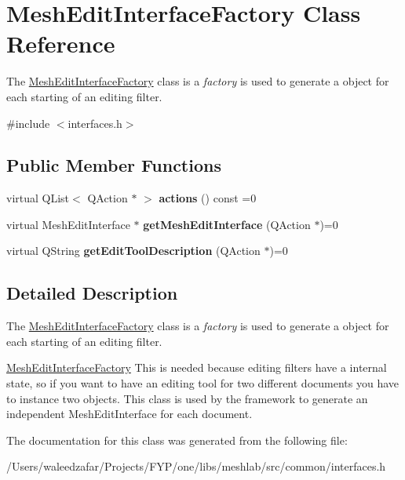 \hypertarget{class_mesh_edit_interface_factory}{}\section{Mesh\+Edit\+Interface\+Factory Class Reference}
\label{class_mesh_edit_interface_factory}


The \hyperlink{class_mesh_edit_interface_factory}{Mesh\+Edit\+Interface\+Factory} class is a {\itshape factory} is used to generate a object for each starting of an editing filter.  




{\ttfamily \#include $<$interfaces.\+h$>$}

\subsection*{Public Member Functions}
\begin{DoxyCompactItemize}
\item 
\mbox{\label{class_mesh_edit_interface_factory_a7a63929ab65e4a50ed232fc45916c4ef}} 
virtual Q\+List$<$ Q\+Action $\ast$ $>$ {\bfseries actions} () const =0
\item 
\mbox{\label{class_mesh_edit_interface_factory_a65590a7908230e835c9f0fcab5992871}} 
virtual Mesh\+Edit\+Interface $\ast$ {\bfseries get\+Mesh\+Edit\+Interface} (Q\+Action $\ast$)=0
\item 
\mbox{\label{class_mesh_edit_interface_factory_a3bbcd0d514d5b620cdc016d4fe6379f4}} 
virtual Q\+String {\bfseries get\+Edit\+Tool\+Description} (Q\+Action $\ast$)=0
\end{DoxyCompactItemize}


\subsection{Detailed Description}
The \hyperlink{class_mesh_edit_interface_factory}{Mesh\+Edit\+Interface\+Factory} class is a {\itshape factory} is used to generate a object for each starting of an editing filter. 

\hyperlink{class_mesh_edit_interface_factory}{Mesh\+Edit\+Interface\+Factory} This is needed because editing filters have a internal state, so if you want to have an editing tool for two different documents you have to instance two objects. This class is used by the framework to generate an independent Mesh\+Edit\+Interface for each document. 

The documentation for this class was generated from the following file\+:\begin{DoxyCompactItemize}
\item 
/\+Users/waleedzafar/\+Projects/\+F\+Y\+P/one/libs/meshlab/src/common/interfaces.\+h\end{DoxyCompactItemize}
